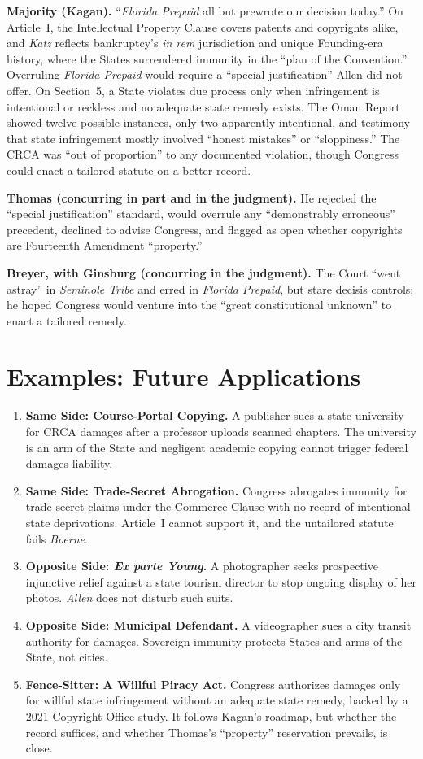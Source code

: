 \documentclass[12pt]{article}
\begin{document}
\textbf{Majority (Kagan).} ``\textit{Florida Prepaid} all but prewrote our decision today.'' On Article~I, the Intellectual Property Clause covers patents and copyrights alike, and \textit{Katz} reflects bankruptcy's \textit{in rem} jurisdiction and unique Founding-era history, where the States surrendered immunity in the ``plan of the Convention.'' Overruling \textit{Florida Prepaid} would require a ``special justification'' Allen did not offer. On Section~5, a State violates due process only when infringement is intentional or reckless and no adequate state remedy exists. The Oman Report showed twelve possible instances, only two apparently intentional, and testimony that state infringement mostly involved ``honest mistakes'' or ``sloppiness.'' The CRCA was ``out of proportion'' to any documented violation, though Congress could enact a tailored statute on a better record.

\textbf{Thomas (concurring in part and in the judgment).} He rejected the ``special justification'' standard, would overrule any ``demonstrably erroneous'' precedent, declined to advise Congress, and flagged as open whether copyrights are Fourteenth Amendment ``property.''

\textbf{Breyer, with Ginsburg (concurring in the judgment).} The Court ``went astray'' in \textit{Seminole Tribe} and erred in \textit{Florida Prepaid}, but stare decisis controls; he hoped Congress would venture into the ``great constitutional unknown'' to enact a tailored remedy.

\section{Examples: Future Applications}

\begin{enumerate}
\item \textbf{Same Side: Course-Portal Copying.} A publisher sues a state university for CRCA damages after a professor uploads scanned chapters. The university is an arm of the State and negligent academic copying cannot trigger federal damages liability.
\item \textbf{Same Side: Trade-Secret Abrogation.} Congress abrogates immunity for trade-secret claims under the Commerce Clause with no record of intentional state deprivations. Article~I cannot support it, and the untailored statute fails \textit{Boerne}.
\item \textbf{Opposite Side: \textit{Ex parte Young}.} A photographer seeks prospective injunctive relief against a state tourism director to stop ongoing display of her photos. \textit{Allen} does not disturb such suits.
\item \textbf{Opposite Side: Municipal Defendant.} A videographer sues a city transit authority for damages. Sovereign immunity protects States and arms of the State, not cities.
\item \textbf{Fence-Sitter: A Willful Piracy Act.} Congress authorizes damages only for willful state infringement without an adequate state remedy, backed by a 2021 Copyright Office study. It follows Kagan's roadmap, but whether the record suffices, and whether Thomas's ``property'' reservation prevails, is close.
\end{enumerate}
\end{document}
